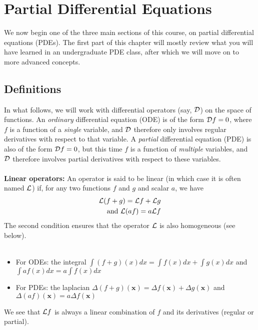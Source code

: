 
\chapter{Partial Differential Equations}

We now begin one of the three main sections of this course, on partial differential equations (PDEs). The first part of this chapter will mostly review what you will have learned in an undergraduate PDE class, after which we will move on to more advanced concepts.

\section{Definitions}

In what follows, we will work with differential operators (say, ${\cal D}$) on the space of functions. An {\it ordinary} differential equation (ODE) is of the form ${\cal D}f= 0$, where $f$ is a function of a {\it single} variable, and ${\cal D}$ therefore only involves regular derivatives with respect to that variable. A {\it partial} differential equation (PDE) is also of the form ${\cal D}f= 0$, but this time $f$ is a function of {\it multiple} variables, and ${\cal D}$ therefore involves partial derivatives with respect to these variables. 
\\
\\
{\bf Linear operators:} An operator is said to be linear (in which case it is often named ${\cal L}$) if, for any two functions $f$ and $g$ and scalar $a$, we have
\begin{eqnarray}
    {\cal L}(f+g) = {\cal L}f + {\cal L}g \\
   \mbox{ and  } {\cal L}(af) = a {\cal L}f
\end{eqnarray} 
The second condition ensures that the operator ${\cal L}$ is also homogeneous (see below). 
\\
\\
\begin{itemize}
\item For ODEs: the integral $\int (f+g)(x)dx = \int f(x)dx + \int g(x)dx$ 
and $\int af(x)dx = a \int f(x)dx$ 
\item For PDEs: the laplacian $\Delta (f+g)(\mathbf{x}) = \Delta f(\mathbf{x}) + \Delta g(\mathbf{x})$ 
and $\Delta (af)(\mathbf{x}) = a \Delta f(\mathbf{x})$
\end{itemize}
We see that ${\cal L}f$ is always a linear combination of $f$ and its derivatives (regular or partial). 
